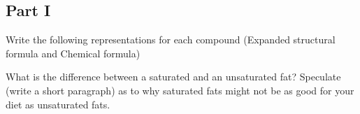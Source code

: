 \documentclass[addpoints, 12pt]{exam}
\begin{document}
\begin{questions}

\section*{Part I}

\question[32] Write the following representations for each compound
(Expanded structural formula   and   Chemical formula)

\vspace{1cm}

\question[10] What is the difference between a saturated and an
unsaturated fat?  Speculate (write a short paragraph) as to why
saturated fats might not be as good for your diet as unsaturated fats.
\vspace{2cm}


\end{questions}
\end{document}
